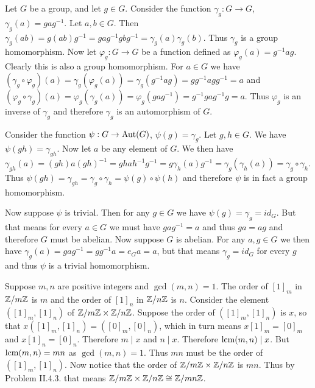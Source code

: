 \begin{problem}
\end{problem}

\begin{solution}
	Let $G$ be a group, and let $g \in G$. Consider the function $\gamma_g: G \to G$, $\gamma_g(a) = gag^{-1}$. Let $a, b \in G$. Then $\gamma_g(ab) = g(ab)g^{-1} = gag^{-1}gbg^{-1} = \gamma_g(a) \gamma_g(b)$. Thus $\gamma_g$ is a group homomorphism. Now let $\varphi_g: G \to G$ be a function defined as $\varphi_g(a) = g^{-1}ag$. Clearly this is also a group homomorphism. For $a \in G$ we have $(\gamma_g \circ \varphi_g)(a) = \gamma_g(\varphi_g(a)) = \gamma_g(g^{-1}ag) = gg^{-1}agg^{-1} = a$ and $(\varphi_g \circ \gamma_g)(a) = \varphi_g(\gamma_g(a)) = \varphi_g(gag^{-1}) = g^{-1}gag^{-1}g = a$. Thus $\varphi_g$ is an inverse of $\gamma_g$ and therefore $\gamma_g$ is an automorphism of $G$.
	
	Consider the function $\psi: G \to \mathrm{Aut}(G)$, $\psi(g) = \gamma_g$. Let $g, h \in G$. We have $\psi(gh) = \gamma_{gh}$. Now let $a$ be any element of $G$. We then have $\gamma_{gh}(a) = (gh)a(gh)^{-1} = ghah^{-1}g^{-1} = g \gamma_h(a) g^{-1} = \gamma_g(\gamma_h(a)) = \gamma_g \circ \gamma_h$. Thus $\psi(gh) = \gamma_{gh} = \gamma_g \circ \gamma_h = \psi(g) \circ \psi(h)$ and therefore $\psi$ is in fact a group homomorphism.
	
	Now suppose $\psi$ is trivial. Then for any $g \in G$ we have $\psi(g) = \gamma_g = id_G$. But that means for every $a \in G$ we must have $gag^{-1} = a$ and thus $ga = ag$ and therefore $G$ must be abelian. Now suppose $G$ is abelian. For any $a, g \in G$ we then have $\gamma_g(a) = gag^{-1} = gg^{-1}a = e_G a = a$, but that means $\gamma_g = id_G$ for every $g$ and thus $\psi$ is a trivial homomorphism.
\end{solution}

\begin{problem}
\end{problem}

\begin{solution}
	Suppose $m, n$ are positive integers and $\gcd(m, n) = 1$. The order of $[1]_m$ in $\mathbb{Z}/m\mathbb{Z}$ is $m$ and the order of $[1]_n$ in $\mathbb{Z}/n\mathbb{Z}$ is $n$. Consider the element $([1]_m, [1]_n)$ of $\mathbb{Z}/m\mathbb{Z} \times \mathbb{Z}/n\mathbb{Z}$. Suppose the order of $([1]_m, [1]_n)$ is $x$, so that $x ([1]_m, [1]_n) = ([0]_m, [0]_n)$, which in turn means $x [1]_m = [0]_m$ and $x [1]_n = [0]_n$. Therefore $m \mid x$ and $n \mid x$. Therefore $\operatorname{lcm}(m, n) \mid x$. But $\operatorname{lcm}(m, n) = mn$ as $\gcd(m, n) = 1$. Thus $mn$ must be the order of $([1]_m, [1]_n)$. Now notice that the order of $\mathbb{Z}/m\mathbb{Z} \times \mathbb{Z}/n\mathbb{Z}$ is $mn$. Thus by Problem II.4.3. that means $\mathbb{Z}/m\mathbb{Z} \times \mathbb{Z}/n\mathbb{Z} \cong \mathbb{Z}/mn\mathbb{Z}$.
\end{solution}

